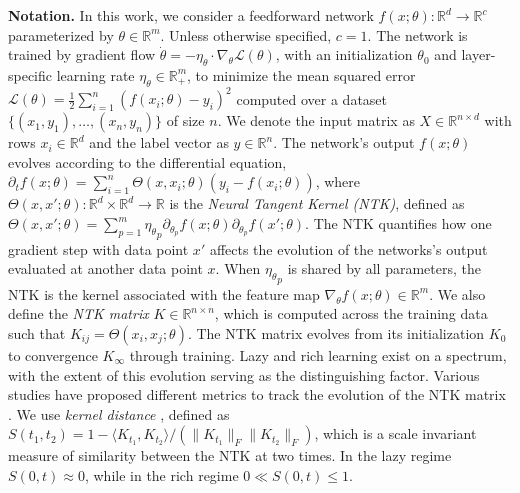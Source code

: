 \documentclass{article}
\theoremstyle{plain}
\theoremstyle{definition}
\theoremstyle{remark}
\begin{document}
\textbf{Notation.}
%
In this work, we consider a feedforward network $f(x;\theta): \mathbb{R}^d \to \mathbb{R}^c$ parameterized by $\theta \in \mathbb{R}^m$.
%
Unless otherwise specified, $c = 1$.
%
The network is trained by gradient flow $\dot{\theta} = -{\eta_{\theta}} \cdot \nabla_{\theta} \mathcal{L}(\theta)$, with an initialization $\theta_0$ and layer-specific learning rate $\eta_{\theta} \in \mathbb{R}^m_+$, to minimize the mean squared error $\mathcal{L}(\theta) = \frac{1}{2} \sum_{i=1}^n (f(x_i;\theta) - y_i)^2$ computed over a dataset $\{(x_1,y_1),\dots,(x_n,y_n)\}$ of size $n$.
%
We denote the input matrix as $X \in \mathbb{R}^{n \times d}$ with rows $x_i \in \mathbb{R}^d$ and the label vector as $y \in \mathbb{R}^n$.
%
%
The network's output $f(x;\theta)$ evolves according to the differential equation, $\partial_tf(x;\theta) = \sum_{i=1}^n \Theta(x,x_i;\theta)(y_i - f(x_i;\theta))$, where $\Theta(x,x';\theta) : \mathbb{R}^{d} \times \mathbb{R}^{d} \to \mathbb{R}$ is the \emph{Neural Tangent Kernel (NTK)}, defined as $\Theta(x, x'; \theta) = \sum_{p = 1}^m {\eta_{\theta}}_p \partial_{\theta_p} f(x;\theta)\partial_{\theta_p} f(x';\theta)$.
%
The NTK quantifies how one gradient step with data point $x'$ affects the evolution of the networks's output evaluated at another data point $x$.
%
When ${\eta_{\theta}}_p$ is shared by all parameters, the NTK is the kernel associated with the feature map $\nabla_\theta f(x;\theta) \in \mathbb{R}^m$.
%
We also define the \emph{NTK matrix} $K \in \mathbb{R}^{n \times n}$, which is computed across the training data such that $K_{ij} = \Theta(x_i, x_j;\theta)$.
%
The NTK matrix evolves from its initialization $K_0$ to convergence $K_\infty$ through training.
%
Lazy and rich learning exist on a spectrum, with the extent of this evolution serving as the distinguishing factor.
%
Various studies have proposed different metrics to track the evolution of the NTK matrix \cite{cortes2012algorithms, geiger2020disentangling, baratin2021implicit}.
%
We use \emph{kernel distance} \cite{fort2020deep}, defined as
$S(t_1,t_2) = 1 - \langle K_{t_1}, K_{t_2}\rangle / \left(\|K_{t_1}\|_F\|K_{t_2}\|_F\right)$, which is a scale invariant measure of similarity between the NTK at two times.
%
In the lazy regime $S(0,t) \approx 0$, while in the rich regime $0 \ll S(0,t) \le 1$.
\end{document}
